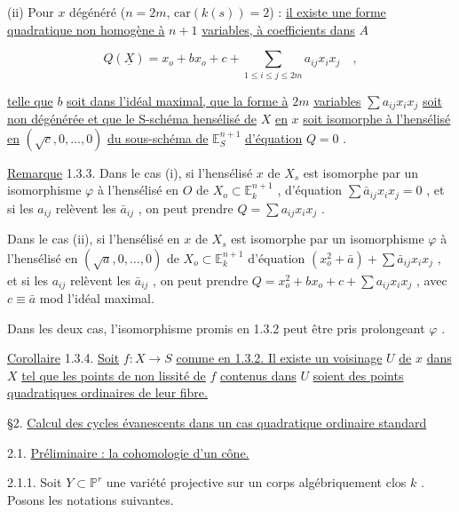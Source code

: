 (ii) Pour $x$ dégénéré ($n = 2m$, $\mathrm{car}(k(s)) = 2$) : \underline{il existe une forme quadratique non homogène à} $n+1$ \underline{variables, à coefficients dans} $A$

\begin{equation}\tag{4.14.2}
Q(\underline{X}) = x_o + b x_o + c + \sum_{1 \leq i \leq j \leq 2m} a_{ij} x_i x_j \quad , 
\end{equation}


 \underline{telle que} $b$ \underline{soit dans l'idéal maximal, que la forme à} $2m$ \underline{variables} $\sum a_{ij} x_i x_j$ \underline{soit non dégénérée et que le S-schéma hensélisé de} $X$ \underline{en} $x$ \underline{soit isomorphe à l'hensélisé en} $(\sqrt{c},0,\ldots,0)$ \underline{du sous-schéma de} $\mathbb{E}^{n+1}_S$ \underline{d'équation} $Q = 0$ .

\underline{Remarque} 1.3.3. Dans le cas (i), si l'hensélisé $x$ de $X_s$ est isomorphe par un isomorphisme $\varphi$ à l'hensélisé en $O$ de $X_o \subset \mathbb{E}^{n+1}_k$ , d'équation $\sum \bar{a}_{ij} x_i x_j = 0$ , et si les $a_{ij}$ relèvent les $\bar{a}_{ij}$ , on peut prendre $Q = \sum a_{ij} x_i x_j$ .

Dans le cas (ii), si l'hensélisé en $x$ de $X_s$ est isomorphe par un isomorphisme $\varphi$ à l'hensélisé en $(\sqrt{a},0,\ldots,0)$ de $X_o \subset \mathbb{E}^{n+1}_k$ d'équation $(x_o^2 + \bar{a}) + \sum \bar{a}_{ij} x_i x_j$ , et si les $a_{ij}$ relèvent les $\bar{a}_{ij}$ , on peut prendre $Q = x_o^2 + bx_o + c + \sum a_{ij} x_i x_j$ , avec $c \equiv \bar{a}$ mod l'idéal maximal.

Dans les deux cas, l'isomorphisme promis en 1.3.2 peut être pris prolongeant $\varphi$ .

\underline{Corollaire} 1.3.4. \underline{Soit} $f : X \to S$ \underline{comme en 1.3.2. Il existe un voisinage} $U$ \underline{de} $x$ \underline{dans} $X$ \underline{tel que les points de non lissité de} $f$ \underline{contenus dans} $U$ \underline{soient des points quadratiques ordinaires de leur fibre.}




§2. \underline{Calcul des cycles évanescents dans un cas quadratique ordinaire standard}


2.1. \underline{Préliminaire : la cohomologie d'un cône.}

2.1.1. Soit $Y \subset \mathbb{P}^r$ une variété projective sur un corps algébriquement clos $k$ . Posons les notations suivantes.

